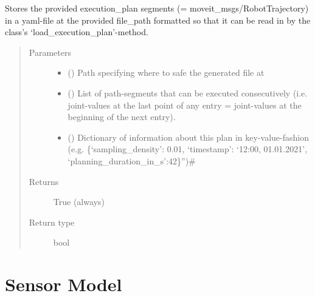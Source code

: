 \documentclass[letterpaper,10pt,english]{sphinxmanual}
\begin{document}
\begin{fulllineitems}
\begin{fulllineitems}
\label{\detokenize{module_trajectory_manager:agiprobot_measurement.trajectory_manager.TrajectoryManager.store_execution_plan}}
Stores the provided execution\_plan segments (= moveit\_msgs/RobotTrajectory) in a yaml-file at the provided file\_path formatted so that it can be read in by the class’s ‘load\_execution\_plan’-method.
\begin{quote}\begin{description}
\item[{Parameters}] \leavevmode\begin{itemize}
\item {} 
 () \textendash{} Path specifying where to safe the generated file at

\item {} 
 () \textendash{} List of path-segments that can be executed consecutively (i.e. joint-values at the last point of any entry = joint-values at the beginning of the next entry).

\item {} 
 () \textendash{} Dictionary of information about this plan in key-value-fashion (e.g. \{‘sampling\_density’: 0.01, ‘timestamp’: ‘12:00, 01.01.2021’, ‘planning\_duration\_in\_s’:42\}”)\#

\end{itemize}

\item[{Returns}] \leavevmode
True (always)

\item[{Return type}] \leavevmode
bool

\end{description}\end{quote}

\end{fulllineitems}


\end{fulllineitems}



\chapter{Sensor Model}
\label{\detokenize{module_sensor_model::doc}}\label{\detokenize{module_sensor_model:sensor-model}}\label{\detokenize{module_sensor_model:id1}}
\end{document}
